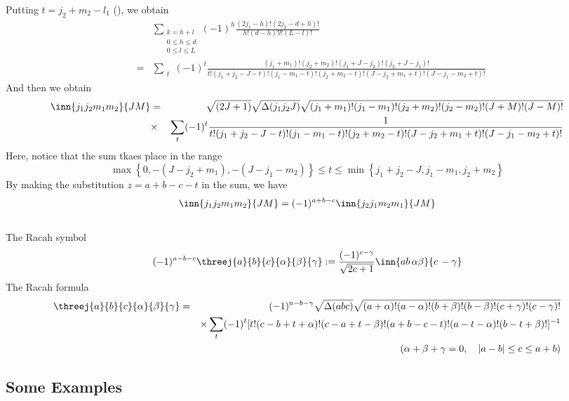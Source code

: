 \documentclass{article}
\begin{document}
Putting $t=j_2 + m_2 -l_1$ (\cite{Racah}), we obtain
\begin{eqnarray}
&&\sum_{\substack{k=h+l\\0\le h \le d\\0\le l \le L}}  (-1)^h \frac{(2j_1-h)!(2j_2-d+h)!}{h!(d-h)!l!(L-l)!} \nonumber\\
&=& \sum_{\substack{t}} (-1)^t \frac{(j_1+m_1)!(j_2+m_2)!(j_1+J-j_2)!(j_2+J-j_1)!}{t!(j_1 + j_2 -J - t)!(j_1 - m_1 - t)!(j_2 +m_2 -t)!(J-j_2 +m_1+t)!(J-j_1 -m_2 +t)!} \nonumber
\end{eqnarray}
And then we obtain
\begin{eqnarray}
\inn{j_1j_2m_1m_2}{JM} & = & \sqrt{(2J+1)}\sqrt{\Delta(j_1j_2J)}\sqrt{(j_1 + m_1)!(j_1-m_1)!(j_2+m_2 )!(j_2-m_2)!(J+M)!(J-M)!}  \nonumber\\
 & \times &  \sum_{\substack{t}} (-1)^t \frac{1}{t!(j_1 + j_2 -J - t)!(j_1 - m_1 - t)!(j_2 +m_2 -t)!(J-j_2 +m_1+t)!(J-j_1 -m_2 +t)!} \nonumber\\
\end{eqnarray}
Here, notice that the sum tkaes place in the range
\begin{equation}
\label{}
\max \left\{0,-(J-j_2 +m_1),-(J-j_1 -m_2)\right\} \le t \le \min \left\{j_1 + j_2 -J,j_1 - m_1,j_2 +m_2\right\}
\end{equation}
By making the substitution $z=a+b-c-t$ in the sum, we have
\begin{equation}
\label{}
\inn{j_1j_2m_1m_2}{JM} = (-1)^{a+b-c}\inn{j_2j_1m_2m_1}{JM}
\end{equation}
\\
The Racah symbol
\begin{equation}
\label{ }
(-1)^{a-b-c}\threej{a}{b}{c}{\alpha}{\beta}{\gamma} := \frac{(-1)^{c-\gamma}}{\sqrt{2c+1}}\inn{ab\,\alpha\beta}{c\,-\gamma}
\end{equation} 
The Racah formula
\begin{eqnarray}
\threej{a}{b}{c}{\alpha}{\beta}{\gamma} & = & (-1)^{a-b-\gamma}\sqrt{\Delta(abc)}\sqrt{(a+\alpha)!(a-\alpha)!(b+\beta)!(b-\beta)!(c+\gamma)!(c-\gamma)!} \nonumber\\
 && \times \sum_t (-1)^t [t!(c-b+t+\alpha)!(c-a+t-\beta)!(a+b-c-t)!(a-t-\alpha)!(b-t+\beta)!]^{-1} \nonumber\\
 &&(\alpha + \beta + \gamma =0, \quad |a-b| \le c \le a+b) \nonumber
\end{eqnarray}

\subsection{Some Examples}
\label{sec-4-3}
\end{document}
